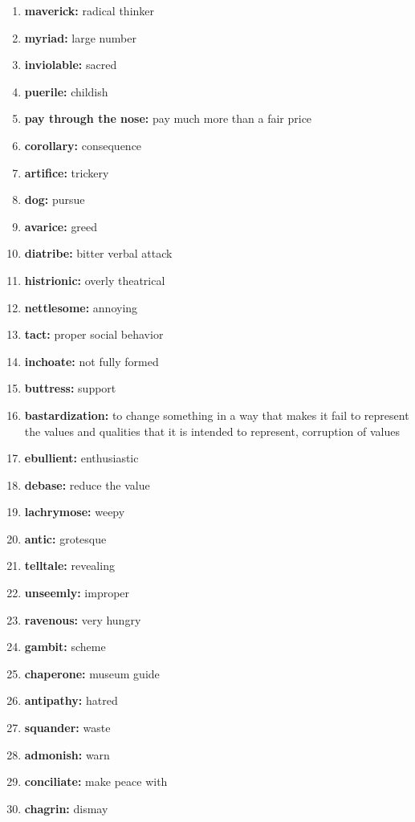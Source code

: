 \documentclass{article}
\begin{document}
\begin{enumerate}
    \item \textbf{maverick: }{radical thinker}
    \item \textbf{myriad: }{large number}
    \item \textbf{inviolable: }{sacred}
    \item \textbf{puerile: }{childish}
    \item \textbf{pay through the nose: }{pay much more than a fair price}
    \item \textbf{corollary: }{consequence}
    \item \textbf{artifice: }{trickery}
    \item \textbf{dog: }{pursue}
    \item \textbf{avarice: }{greed}
    \item \textbf{diatribe: }{bitter verbal attack}
    \item \textbf{histrionic: }{overly theatrical}
    \item \textbf{nettlesome: }{annoying}
    \item \textbf{tact: }{proper social behavior}
    \item \textbf{inchoate: }{not fully formed}
    \item \textbf{buttress: }{support}
    \item \textbf{bastardization: }{to change something in a way that makes it fail to represent the values and qualities that it is intended to represent, corruption of values}
    \item \textbf{ebullient: }{enthusiastic}
    \item \textbf{debase: }{reduce the value}
    \item \textbf{lachrymose: }{weepy}
    \item \textbf{antic: }{grotesque}
    \item \textbf{telltale: }{revealing}
    \item \textbf{unseemly: }{improper}
    \item \textbf{ravenous: }{very hungry}
    \item \textbf{gambit: }{scheme}
    \item \textbf{chaperone: }{museum guide}
    \item \textbf{antipathy: }{hatred}
    \item \textbf{squander: }{waste}
    \item \textbf{admonish: }{warn}
    \item \textbf{conciliate: }{make peace with}
    \item \textbf{chagrin: }{dismay}

\end{enumerate}
\end{document}
